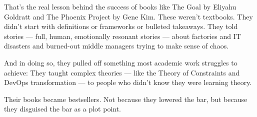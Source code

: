 That’s the real lesson behind the success of books like The Goal by Eliyahu Goldratt and The Phoenix Project by Gene Kim.
These weren’t textbooks. They didn’t start with definitions or frameworks or bulleted takeaways.
They told stories — full, human, emotionally resonant stories — about factories and IT disasters and burned-out middle managers trying to make sense of chaos.

And in doing so, they pulled off something most academic work struggles to achieve:
They taught complex theories — like the Theory of Constraints and DevOps transformation — to people who didn’t know 
they were learning theory.

Their books became bestsellers. Not because they lowered the bar, but because they disguised the bar as a plot point.

\medskip


